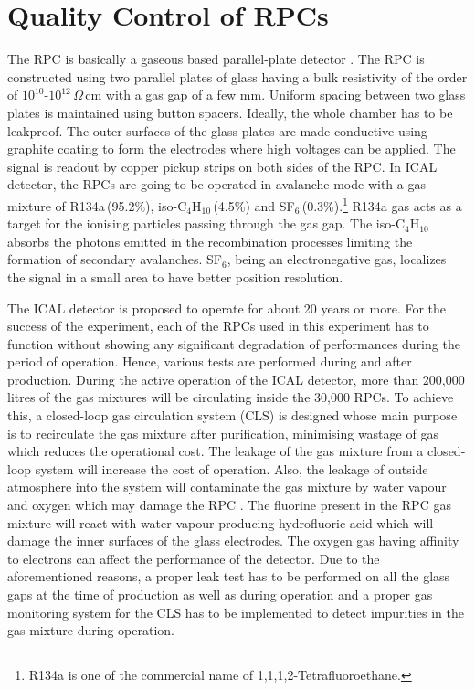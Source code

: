\documentclass[a4paper,12pt,twoside,openany]{article}
\begin{document}
\section{Quality Control of RPCs}

The RPC is basically a gaseous based parallel-plate detector
\cite{rpc_p2}. The RPC is constructed using two parallel plates of
glass having a bulk resistivity of the order of
$10^{10}$-$10^{12}$\,$\Omega$\,cm with a gas gap of a few mm. Uniform
spacing between two glass plates is maintained using button spacers.
Ideally, the whole chamber has to be leakproof. The outer surfaces of
the glass plates are made conductive using graphite coating to form
the electrodes where high voltages can be applied. The signal is
readout by copper pickup strips on both sides of the RPC. In ICAL
detector, the RPCs are going to be operated in avalanche mode with
a gas mixture of R134a\,(95.2\%), iso-C$_4$H$_{10}$\,(4.5\%) and
SF$_6$\,(0.3\%).\footnote{R134a is one of the commercial name of 1,1,1,2-Tetrafluoroethane.}
R134a gas acts as a target for the ionising particles passing through
the gas gap. The iso-C$_4$H$_{10}$ absorbs the photons emitted in the
recombination processes limiting the formation of secondary
avalanches. SF$_6$, being an electronegative gas, localizes the signal
in a small area to have better position resolution.

The ICAL detector is proposed to operate for about 20 years or more.
For the success of the experiment, each of the RPCs used in this
experiment has to function without showing any significant degradation
of performances during the period of operation. Hence, various tests
are performed during and after production. During the active operation
of the ICAL detector, more than 200,000\,litres of the gas mixtures
will be circulating inside the 30,000 RPCs. To achieve this, a
closed-loop gas circulation system (CLS) is designed whose main
purpose is to recirculate the gas mixture after purification,
minimising wastage of gas which reduces the operational cost. The
leakage of the gas mixture from a closed-loop system will increase the
cost of operation. Also, the leakage of outside atmosphere into the
system will contaminate the gas mixture by water vapour and oxygen
which may damage the RPC \cite{rpc_c,rpc_w}. The fluorine present in
the RPC gas mixture will react with water vapour producing
hydrofluoric acid which will damage the inner surfaces of the glass
electrodes. The oxygen gas having affinity to electrons can affect the
performance of the detector. Due to the aforementioned reasons, a
proper leak test has to be performed on all the glass gaps at the time
of production as well as during operation and a proper gas monitoring
system for the CLS has to be implemented to detect impurities in the
gas-mixture during operation.
\end{document}
